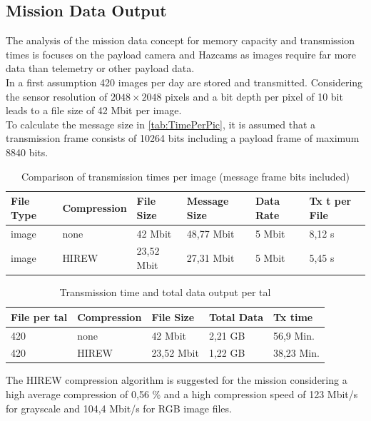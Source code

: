 \subsection{Mission Data Output}
\label{app:MissionDataOutput}

The analysis of the mission data concept for memory capacity and transmission times is focuses on the payload camera and Hazcams as images require far more data than telemetry or other payload data. \\

In a first assumption 420 images per day are stored and transmitted. Considering the sensor resolution of $2048\times2048$ pixels and a bit depth per pixel of 10 bit leads to a file size of 42 Mbit per image.\\
To calculate the message size in \autoref{tab:TimePerPic}, it is assumed that a transmission frame consists of 10264 bits including a payload frame of maximum 8840 bits.   

\begin{table}[h]
\centering
\begin{tabular}{llllll}
File Type & Compression    & File Size  & Message Size & Data Rate & Tx t per File \\ \hline\hline
image     & none           & 42 Mbit    & 48,77 Mbit   & 5 Mbit    & 8,12 s        \\
image     & HIREW          & 23,52 Mbit & 27,31 Mbit   & 5 Mbit    & 5,45 s        \\ \hline
\end{tabular}
\caption{Comparison of transmission times per image (message frame bits included)}
\label{tab:TimePerPic}
\end{table}

\begin{table}[h]
\centering
\begin{tabular}{lllll}
File per tal & Compression & File Size  & Total Data & Tx time    \\ \hline\hline
420          & none        & 42 Mbit    & 2,21 GB    & 56,9 Min.  \\
420          & HIREW       & 23,52 Mbit & 1,22 GB    & 38,23 Min. \\ \hline
\end{tabular}
\caption{Transmission time and total data output per tal}
\label{tab:Tx-tptal}
\end{table}

The HIREW compression algorithm is suggested for the mission considering a high average compression of 0,56 \% and a high compression speed of 123 Mbit/s for grayscale and 104,4 Mbit/s for RGB image files. 

